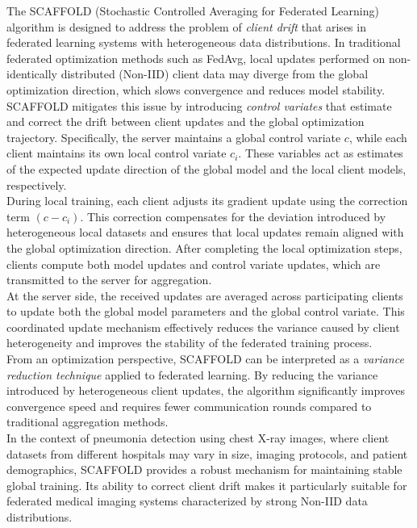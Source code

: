 \documentclass[12pt]{book}
\begin{document}
The SCAFFOLD (Stochastic Controlled Averaging for Federated Learning) algorithm is designed to address the problem of \textit{client drift} that arises in federated learning systems with heterogeneous data distributions. In traditional federated optimization methods such as FedAvg, local updates performed on non-identically distributed (Non-IID) client data may diverge from the global optimization direction, which slows convergence and reduces model stability.\\
SCAFFOLD mitigates this issue by introducing \textit{control variates} that estimate and correct the drift between client updates and the global optimization trajectory. Specifically, the server maintains a global control variate $c$, while each client maintains its own local control variate $c_i$. These variables act as estimates of the expected update direction of the global model and the local client models, respectively.\\
During local training, each client adjusts its gradient update using the correction term $(c - c_i)$. This correction compensates for the deviation introduced by heterogeneous local datasets and ensures that local updates remain aligned with the global optimization direction. After completing the local optimization steps, clients compute both model updates and control variate updates, which are transmitted to the server for aggregation.\\
At the server side, the received updates are averaged across participating clients to update both the global model parameters and the global control variate. This coordinated update mechanism effectively reduces the variance caused by client heterogeneity and improves the stability of the federated training process.\\
From an optimization perspective, SCAFFOLD can be interpreted as a \textit{variance reduction technique} applied to federated learning. By reducing the variance introduced by heterogeneous client updates, the algorithm significantly improves convergence speed and requires fewer communication rounds compared to traditional aggregation methods.\\
In the context of pneumonia detection using chest X-ray images, where client datasets from different hospitals may vary in size, imaging protocols, and patient demographics, SCAFFOLD provides a robust mechanism for maintaining stable global training. Its ability to correct client drift makes it particularly suitable for federated medical imaging systems characterized by strong Non-IID data distributions.
\end{document}
